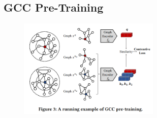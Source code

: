 \documentclass{article}
\begin{document}
\subsection{GCC Pre-Training}
\begin{figure}[htbp]
    \centering
    \includegraphics[width=0.6\textwidth]{gcc-fig.png}
\end{figure}
\end{document}
